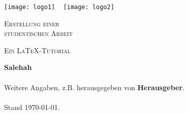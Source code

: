 \thispagestyle{empty}	


\begin{flushright}

	\texttt{[image: logo1]}
	~
	\texttt{[image: logo2]}


	\vfill

	\begin{Huge}
		\textsc{Erstellung einer\\ studentischen Arbeit}
	\end{Huge}
	
	\vspace{1cm}

	\begin{Large}
		\textsc{Ein \LaTeX{}-Tutorial}
	\end{Large}
	
	\vspace{5cm}
	
	\textbf{Salehah}\\
	~\\
	Weitere Angaben, z.B. herausgegeben von \textbf{Herausgeber}.\\
	~\\
	Stand \today.
	
	\vspace{3cm}	
	
\end{flushright}

